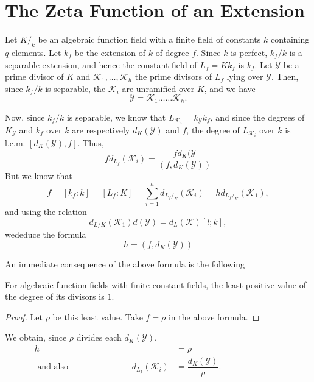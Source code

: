 \section{The Zeta Function of an Extension}\label{chap23:sec39}%

Let $K/_k$ be an algebraic function field with a finite field of
constants $k$ containing $q$ elements. Let $k_f$ be the extension of
$k$ of degree $f$. Since $k$ is perfect, $k_f/k$ is a separable
extension, and hence the constant field of $L_f = K k_f$ is $k_f$. Let
$\mathscr{Y}$ be a prime divisor of $K$ and
$\mathscr{K}_1,\ldots,\mathscr{K}_h$ the prime divisors of $L_f$ lying
over $\mathscr{Y}$. Then, since $k_f/k$ is separable, the
$\mathscr{K}_i$ are unramified over $K$, and we have 
$$
\mathscr{Y} = \mathscr{K}_1 \ldots \ldots \mathscr{K}_h.
$$

Now, since $k_f/k$ is separable, we know that $L_{\mathscr{K}_i}=
k_\mathscr{Y}k_f$, and since the degrees of $K_\mathscr{Y}$ and $k_f$
over $k$ are respectively $d_K(\mathscr{Y})$ and $f$, the degree of
$L_{\mathscr{K}_i}$ over $k$ is l.c.m. $[d_K(\mathscr{Y}), f]$. Thus,  
$$
f d_{L_f} (\mathscr{K}_i) = \frac{f d_K(\mathscr{Y}}{(f, d_K(\mathscr{Y}))}
$$
But we know that
$$
f = \left[ k_f : k \right] = \left[L_f : K \right] = \sum^{h}_{i = 1}
d_{L_f/_K}(\mathscr{K}_i) = h d_{L_f/_K}(\mathscr{K}_1), 
$$
and using the relation   
$$
d_{L/K} (\mathscr{K}_1) d (\mathscr{Y}) = d_L (\mathscr{K}) [l;k], 
$$
we\pageoriginale deduce the formula 
$$
h=(f, d_K(\mathscr{Y}))
$$

An immediate consequence of the above formula is the following
\begin{theorem*}
  For algebraic function fields with finite constant fields, the least
  positive value of the degree of its divisors is $1$. 
\end{theorem*}

\begin{proof}
  Let $\rho$ be this least value. Take $f = \rho$ in the above formula.
\end{proof}

We obtain, since $\rho$ divides each $d_K (\mathscr{Y})$,
\begin{align*}
  h & = \rho \\
  \text{ and also } \hspace{3cm} d_{L_f}(\mathscr{K}_i) &=
  \dfrac{d_K(\mathscr{Y})}{\rho}.\hspace{3cm} 
\end{align*}

